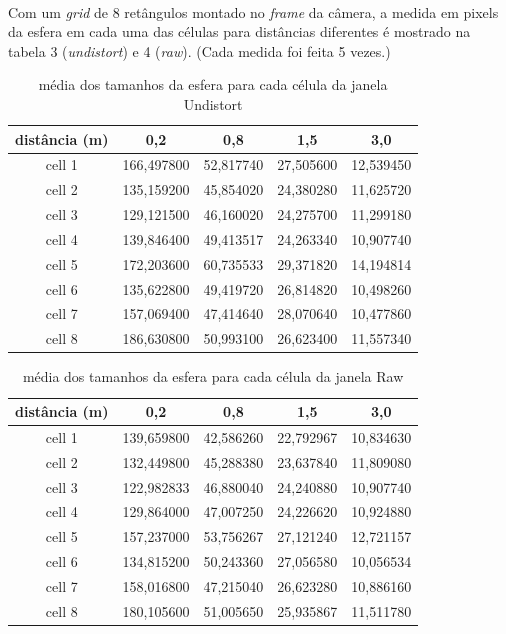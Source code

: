 \documentclass{article}
\begin{document}
			\paragraph{}
			Com um \textit{grid} de 8 retângulos montado no \textit{frame} da câmera, a medida em pixels da esfera em cada uma das células para distâncias diferentes é mostrado na tabela 3 (\textit{undistort}) e 4 (\textit{raw}). (Cada medida foi feita 5 vezes.)
			\begin{table}
				\caption{média dos tamanhos da esfera para cada célula da janela Undistort}
				\centering
				\begin{tabular}{c c c c c}
				distância (m)& 0,2 & 0,8 & 1,5 & 3,0\\
				\hline\hline
				cell 1 & 166,497800 & 52,817740 & 27,505600 & 12,539450\\
				cell 2 & 135,159200 & 45,854020 & 24,380280 & 11,625720\\
				cell 3 & 129,121500 & 46,160020 & 24,275700 & 11,299180\\
				cell 4 & 139,846400 & 49,413517 & 24,263340 & 10,907740\\
				cell 5 & 172,203600 & 60,735533 & 29,371820 & 14,194814\\
				cell 6 & 135,622800 & 49,419720 & 26,814820 & 10,498260\\
				cell 7 & 157,069400 & 47,414640 & 28,070640 & 10,477860\\
				cell 8 & 186,630800 & 50,993100 & 26,623400 & 11,557340\\
				
				\end{tabular}
			\end{table}
			\begin{table}
				\caption{média dos tamanhos da esfera para cada célula da janela Raw}
				\centering
				\begin{tabular}{c c c c c}
				distância (m)& 0,2 & 0,8 & 1,5 & 3,0\\
				\hline\hline
				cell 1 & 139,659800 & 42,586260 & 22,792967 & 10,834630\\
				cell 2 & 132,449800 & 45,288380 & 23,637840 & 11,809080\\
				cell 3 & 122,982833 & 46,880040 & 24,240880 & 10,907740\\
				cell 4 & 129,864000 & 47,007250 & 24,226620 & 10,924880\\
				cell 5 & 157,237000 & 53,756267 & 27,121240 & 12,721157\\
				cell 6 & 134,815200 & 50,243360 & 27,056580 & 10,056534\\
				cell 7 & 158,016800 & 47,215040 & 26,623280 & 10,886160\\
				cell 8 & 180,105600 & 51,005650 & 25,935867 & 11,511780\\
				\end{tabular}
			\end{table}
\end{document}

